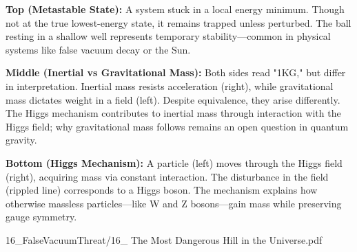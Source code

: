 \begin{SideNotePage}{
    \textbf{Top (Metastable State):}  
    A system stuck in a local energy minimum. Though not at the true lowest-energy state, it remains trapped unless perturbed. The ball resting in a shallow well represents temporary stability—common in physical systems like false vacuum decay or the Sun. \par
  
    \textbf{Middle (Inertial vs Gravitational Mass):}  
    Both sides read "1KG," but differ in interpretation. Inertial mass resists acceleration (right), while gravitational mass dictates weight in a field (left). Despite equivalence, they arise differently. The Higgs mechanism contributes to inertial mass through interaction with the Higgs field; why gravitational mass follows remains an open question in quantum gravity. \par
  
    \textbf{Bottom (Higgs Mechanism):}  
    A particle (left) moves through the Higgs field (right), acquiring mass via constant interaction. The disturbance in the field (rippled line) corresponds to a Higgs boson. The mechanism explains how otherwise massless particles—like W and Z bosons—gain mass while preserving gauge symmetry. \par
}{16_FalseVacuumThreat/16_ The Most Dangerous Hill in the Universe.pdf}
\end{SideNotePage}

